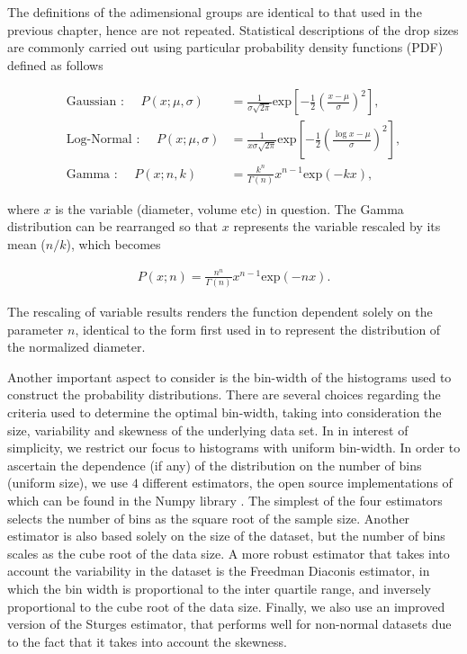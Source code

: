 The definitions of the adimensional groups are identical to that used
in the previous chapter, hence are not repeated.
Statistical descriptions of the drop sizes are commonly carried out using
particular probability density functions (PDF) defined as follows 

\begin{align}
	\text{Gaussian : } \quad P\left( x ; \mu , \sigma \right) &= 
	\frac{1}{\sigma \sqrt{2\pi}} \textrm{exp}\left[-\frac{1}{2}\left(\frac{x - \mu}{\sigma}\right)^2\right] ,\\
	\text{Log-Normal : } \quad P\left( x ; \mu , \sigma \right) &= 
	\frac{1}{x \sigma \sqrt{2\pi}} \textrm{exp}\left[-\frac{1}{2}\left(\frac{\log x - \mu}{\sigma}\right)^2\right] ,\\
	\text{Gamma : } \quad P\left( x ; n,k \right) &= 
	\frac{k^{n}}{\Gamma(n)} x^{n-1} \textrm{exp}\left(-k x\right) , 
\end{align}

where $x$ is the variable (diameter, volume etc) in question. 
The Gamma distribution can be rearranged so that $x$ represents
the variable rescaled by its mean ($n / k$), which becomes 

\begin{align}
	P\left( x ; n \right) = \frac{n^{n}}{\Gamma(n)} x^{n-1} \textrm{exp}\left(-n x\right) . 
\end{align}

The rescaling of variable results renders the function dependent solely 
on the parameter $n$, identical to the form first used in \cite{vill_2}
to represent the distribution of the normalized diameter.  

Another important aspect to consider is the bin-width of the 
histograms used to construct the probability distributions. 
There are several choices regarding the criteria used to determine the optimal bin-width, 
taking into consideration the size, variability and skewness of the underlying data set. 
In in interest of simplicity, we restrict our focus to histograms with uniform bin-width. 
In order to ascertain the dependence (if any) of the distribution on the number of bins  
(uniform size), we use $4$ different estimators, the open source implementations of which
can be found in the Numpy library .
The simplest of the four estimators selects the number 
of bins as the square root of the sample size.
Another estimator is also based solely on the size of the dataset, 
but the number of bins scales as the cube root of the data size.  
A more robust estimator that takes into account the variability in the dataset
is the Freedman Diaconis estimator, in which the bin width is proportional to the 
inter quartile range, and inversely proportional to the cube root of the data size. 
Finally, we also use an improved version of the Sturges estimator, that performs 
well for non-normal datasets due to the fact that it takes into account the skewness. 

